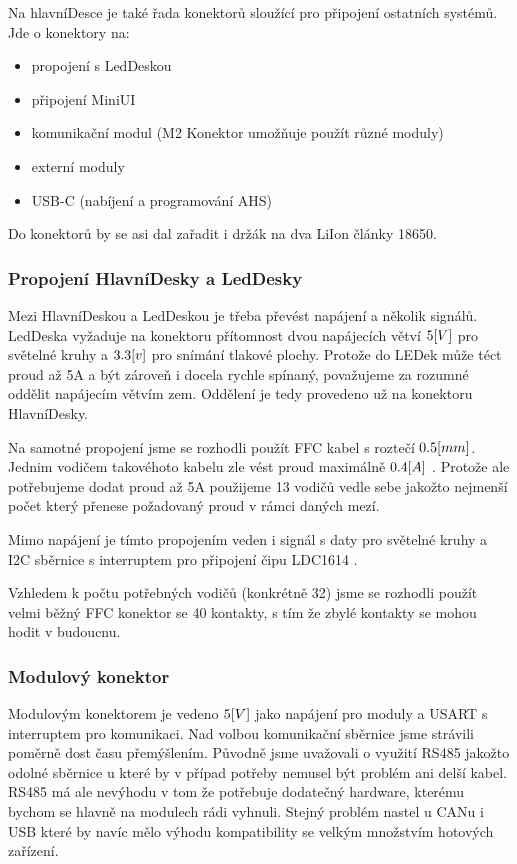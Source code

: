 Na hlavníDesce je také řada konektorů sloužící pro připojení ostatních systémů.
Jde o konektory na:
\begin{itemize}
    \item propojení s LedDeskou                                                     %
    \item připojení MiniUI                                                          %
    \item komunikační modul (M2 Konektor umožňuje použít různé moduly)              %
    \item externí moduly                                                            %
    \item USB-C (nabíjení a programování AHS)                                       %
\end{itemize}
Do konektorů by se asi dal zařadit i držák na dva LiIon články 18650.

\subsubsection{Propojení HlavníDesky a LedDesky}
Mezi HlavníDeskou a LedDeskou je třeba převést napájení a několik signálů.
LedDeska vyžaduje na konektoru přítomnost dvou napájecích větví \(5\-[V]\) pro světelné kruhy a \(3.3\-[v]\) pro snímání tlakové plochy.
Protože do LEDek může téct proud až 5A a být zároveň i docela rychle spínaný, považujeme za rozumné oddělit napájecím větvím zem.
Oddělení je tedy provedeno už na konektoru HlavníDesky.

Na samotné propojení jsme se rozhodli použít FFC kabel s roztečí \(0.5\-[mm]\).
Jednim vodičem takovéhoto kabelu zle vést proud maximálně \(0.4\-[A]\) \cite{FFC-konektor}.
Protože ale potřebujeme dodat proud až 5A použijeme 13 vodičů vedle sebe jakožto nejmenší počet který přenese požadovaný proud v rámci daných mezí.

Mimo napájení je tímto propojením veden i signál s daty pro světelné kruhy a I2C sběrnice s interruptem pro připojení čipu LDC1614 \cite{LDC1614}.

Vzhledem k počtu potřebných vodičů (konkrétně 32) jsme se rozhodli použít velmi běžný FFC konektor se 40 kontakty, s tím že zbylé kontakty se mohou hodit v budoucnu.

\subsubsection{Modulový konektor}
Modulovým konektorem je vedeno \(5\-[V]\) jako napájení pro moduly a USART s interruptem pro komunikaci.
Nad volbou komunikační sběrnice jsme strávili poměrně dost času přemýšlením.
Původně jsme uvažovali o využití RS485 jakožto odolné sběrnice u které by v případ potřeby nemusel být problém ani delší kabel.
RS485 má ale nevýhodu v tom že potřebuje dodatečný hardware, kterému bychom se hlavně na modulech rádi vyhnuli.
Stejný problém nastel u CANu i USB které by navíc mělo výhodu kompatibility se velkým množstvím hotových zařízení.

